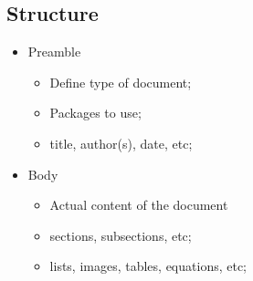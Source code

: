 \documentclass{article} %
\begin{document}
    \subsection{Structure}
    \begin{multicols}{2}
    \begin{itemize}
        \item Preamble
        \begin{itemize}
            \item Define type of document;
            \item Packages to use;
            \item title, author(s), date, etc;
        \end{itemize}
        \item Body
        \begin{itemize}
            \item Actual content of the document
            \item sections, subsections, etc;
            \item lists, images, tables, equations, etc;
        \end{itemize}
    \end{itemize}
    \end{multicols}
    
\end{document}
